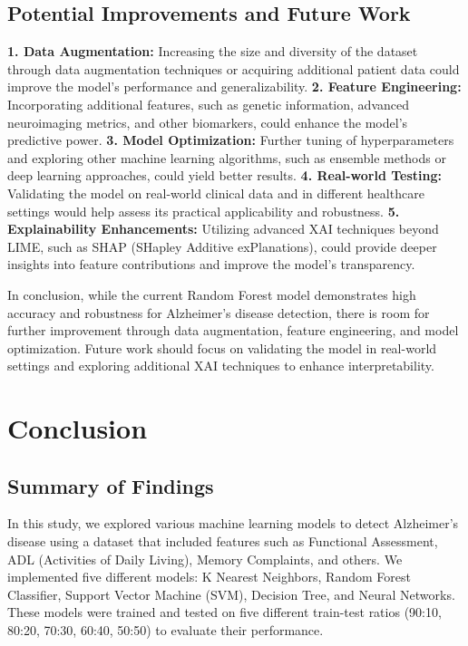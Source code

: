 \documentclass[a4paper,12pt]{report}
\begin{document}
\section{Potential Improvements and Future Work}

\textbf{1. Data Augmentation:} Increasing the size and diversity of the dataset through data augmentation techniques or acquiring additional patient data could improve the model's performance and generalizability.
\newline\textbf{2. Feature Engineering:} Incorporating additional features, such as genetic information, advanced neuroimaging metrics, and other biomarkers, could enhance the model's predictive power.
\newline\textbf{3. Model Optimization:} Further tuning of hyperparameters and exploring other machine learning algorithms, such as ensemble methods or deep learning approaches, could yield better results.
\newline\textbf{4. Real-world Testing:} Validating the model on real-world clinical data and in different healthcare settings would help assess its practical applicability and robustness.
\newline\textbf{5. Explainability Enhancements:} Utilizing advanced XAI techniques beyond LIME, such as SHAP (SHapley Additive exPlanations), could provide deeper insights into feature contributions and improve the model's transparency.

In conclusion, while the current Random Forest model demonstrates high accuracy and robustness for Alzheimer's disease detection, there is room for further improvement through data augmentation, feature engineering, and model optimization. Future work should focus on validating the model in real-world settings and exploring additional XAI techniques to enhance interpretability.



\chapter{Conclusion}

\section{Summary of Findings}

In this study, we explored various machine learning models to detect Alzheimer's disease using a dataset that included features such as Functional Assessment, ADL (Activities of Daily Living), Memory Complaints, and others. We implemented five different models: K Nearest Neighbors, Random Forest Classifier, Support Vector Machine (SVM), Decision Tree, and Neural Networks. These models were trained and tested on five different train-test ratios (90:10, 80:20, 70:30, 60:40, 50:50) to evaluate their performance.
\end{document}
